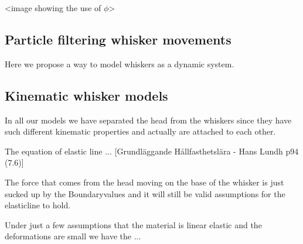 <image showing the use of $\phi$>


\subsection{Particle filtering whisker movements}
Here we propose a way to model whiskers as a dynamic system.

\subsection{Kinematic whisker models}

In all our models we have separated the head from the whiskers since they have
such different kinematic properties and actually are attached to each other.




The equation of elastic line ... [Grundläggande Hållfasthetslära - Hans Lundh
p94 (7.6)]

The force that comes from the head moving on the base of the whisker is just 
sucked up by the Boundaryvalues and it will still be valid assumptions for the
elasticline to hold.

Under just a few assumptions that the material is linear elastic and the
deformations are small we have the ...




